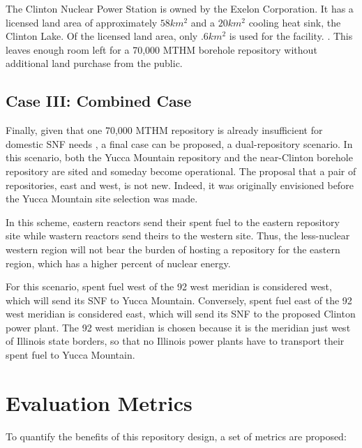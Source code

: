 The Clinton Nuclear Power Station is owned by the Exelon Corporation. It has a 
licensed land area of approximately $58km^2$ and a $20km^2$ cooling heat sink, 
the Clinton Lake. Of the licensed land area, only $.6km^2$ is used for the facility.  
\cite{NRC_Clinton}.  This leaves enough room left for a 70,000 \gls{MTHM} 
borehole repository without additional land purchase from the public.

\subsection{Case III: Combined Case}
Finally, given that one 70,000 MTHM repository is already insufficient for 
domestic \gls{SNF} needs \cite{doe_report_2008}, a final case can be proposed, 
a dual-repository scenario. In this scenario, both the Yucca Mountain 
repository and the near-Clinton borehole repository are sited and someday 
become operational. The proposal that a pair of repositories, east and west, is 
not new. Indeed, it was originally envisioned before the Yucca Mountain site 
selection was made.

In this scheme, eastern reactors send their spent fuel to the eastern 
repository site while wastern reactors send theirs to the western site. Thus, 
the less-nuclear western region will not bear the burden of hosting a 
repository for the eastern region, which has a higher percent of nuclear 
energy. 

For this scenario, spent fuel west of the 92 west meridian is considered west, 
which will send its \gls{SNF} to Yucca Mountain. Conversely, spent fuel east of the 92 west
meridian is considered east, which will send its \gls{SNF} to the proposed Clinton 
power plant. The 92 west meridian is chosen because it is the meridian just west of
Illinois state borders, so that no Illinois power plants have to transport their
spent fuel to Yucca Mountain. %



\section{Evaluation Metrics}

To quantify the benefits of this repository design, a set of metrics are 
proposed:

